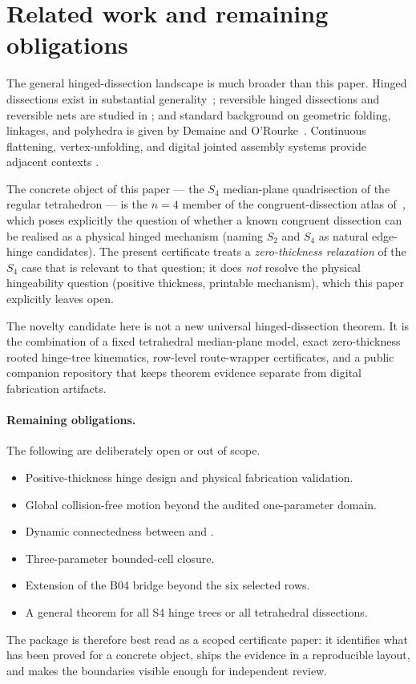 \section{Related work and remaining obligations}
\label{sec:related}

The general hinged-dissection landscape is much broader than this paper.  Hinged
dissections exist in substantial generality~\cite{abbott2007hinged}; reversible
hinged dissections and reversible nets are studied in
\cite{akiyama2018polyhedral,akiyama2016reversible}; and standard background on
geometric folding, linkages, and polyhedra is given by Demaine and
O'Rourke~\cite{demaine2007gfalop}.  Continuous flattening, vertex-unfolding,
and digital jointed assembly systems provide adjacent contexts
\cite{demaine2024continuous,demaine2001vertex,rodsteward2019,joinable2021}.

The concrete object of this paper --- the $S_4$ median-plane quadrisection of the
regular tetrahedron --- is the $n=4$ member of the congruent-dissection atlas
of~\cite{babanskyyCongruentDissections}, which poses explicitly the question of
whether a known congruent dissection can be realised as a physical hinged
mechanism (naming $S_2$ and $S_4$ as natural edge-hinge candidates).  The present
certificate treats a \emph{zero-thickness relaxation} of the $S_4$ case that is
relevant to that question; it does \emph{not} resolve the physical hingeability
question (positive thickness, printable mechanism), which this paper explicitly
leaves open.

The novelty candidate here is not a new universal hinged-dissection theorem.
It is the combination of a fixed tetrahedral median-plane model, exact
zero-thickness rooted hinge-tree kinematics, row-level route-wrapper
certificates, and a public companion repository that keeps theorem evidence separate
from digital fabrication artifacts.

\paragraph{Remaining obligations.}
The following are deliberately open or out of scope.
\begin{itemize}[leftmargin=*]
  \item Positive-thickness hinge design and physical fabrication validation.
  \item Global collision-free motion beyond the audited one-parameter domain.
  \item Dynamic connectedness between \treeA{} and \treeB{}.
  \item Three-parameter bounded-cell closure.
  \item Extension of the B04 bridge beyond the six selected rows.
  \item A general theorem for all S4 hinge trees or all tetrahedral dissections.
\end{itemize}

The package is therefore best read as a scoped certificate paper: it identifies
what has been proved for a concrete object, ships the evidence in a reproducible
layout, and makes the boundaries visible enough for independent review.
